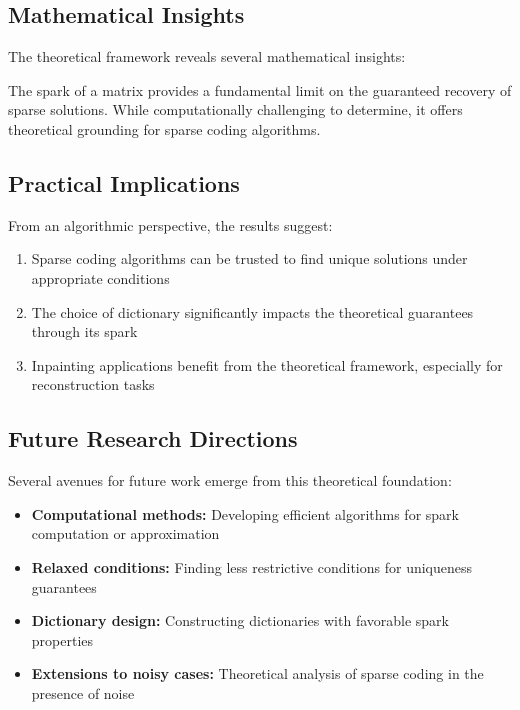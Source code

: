 \documentclass[12pt]{article}
\theoremstyle{definition}
\begin{document}
\subsection{Mathematical Insights}

The theoretical framework reveals several mathematical insights:

\begin{important}
    The spark of a matrix provides a fundamental limit on the guaranteed recovery of sparse solutions. While computationally challenging to determine, it offers theoretical grounding for sparse coding algorithms.
\end{important}

\subsection{Practical Implications}

From an algorithmic perspective, the results suggest:

\begin{enumerate}
    \item Sparse coding algorithms can be trusted to find unique solutions under appropriate conditions
    \item The choice of dictionary significantly impacts the theoretical guarantees through its spark
    \item Inpainting applications benefit from the theoretical framework, especially for reconstruction tasks
\end{enumerate}

\subsection{Future Research Directions}

Several avenues for future work emerge from this theoretical foundation:

\begin{itemize}
    \item \textbf{Computational methods:} Developing efficient algorithms for spark computation or approximation
    \item \textbf{Relaxed conditions:} Finding less restrictive conditions for uniqueness guarantees
    \item \textbf{Dictionary design:} Constructing dictionaries with favorable spark properties
    \item \textbf{Extensions to noisy cases:} Theoretical analysis of sparse coding in the presence of noise
\end{itemize}
\end{document}
